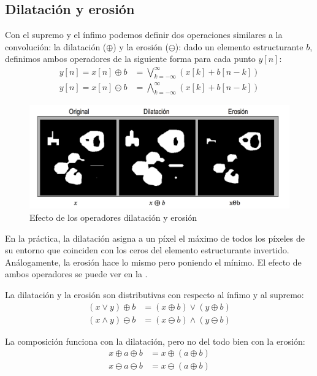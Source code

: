 \documentclass[nochap,palatino]{apuntes}
\begin{document}
\subsection{Dilatación y erosión}

Con el supremo y el ínfimo podemos definir dos operaciones similares a la convolución: la dilatación ($\oplus$) y la erosión ($\ominus$): dado un elemento estructurante $b$, definimos ambos operadores de la siguiente forma para cada punto $y[n]$: \begin{align*}
y[n] = x[n] \oplus b &= \bigvee_{k=-∞}^∞ (x[k] + b[n-k]) \\
y[n] = x[n] \ominus b &= \bigwedge_{k=-∞}^∞ (x[k] + b[n-k])
\end{align*}

\begin{figure}[hbtp]
\centering
\includegraphics[width=1\textwidth]{img/DilatacionErosion.png}
\caption{Efecto de los operadores dilatación y erosión}
\label{fig:DilatacionErosion}
\end{figure}

En la práctica, la dilatación asigna a un píxel el máximo de todos los píxeles de su entorno que coinciden con los ceros del elemento estructurante invertido. Análogamente, la erosión hace lo mismo pero poniendo el mínimo. El efecto de ambos operadores se puede ver en la .

La dilatación y la erosión son distributivas con respecto al ínfimo y al supremo:
\begin{align*}
(x \vee y) \oplus b &= (x\oplus b) \vee (y \oplus b) \\
(x \wedge y) \ominus b &= (x\ominus b) \wedge (y \ominus b)
\end{align*}

La composición funciona con la dilatación, pero no del todo bien con la erosión:
\begin{align*}
x \oplus a \oplus b &= x \oplus (a \oplus b) \\
x \ominus a \ominus b &= x \ominus (a \oplus b)
\end{align*}
\end{document}
